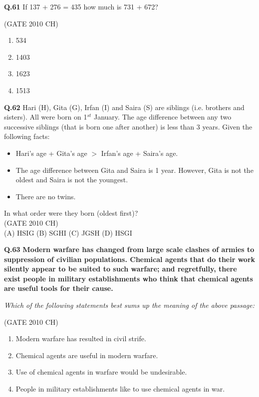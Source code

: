 \documentclass[journal,12pt,onecolumn]{exam}
\theoremstyle{remark}
\begin{document}
\noindent
\textbf{Q.61}
 If 137 + 276 = 435 how much is 731 + 672?

\hfill{(GATE 2010 CH)}\\

 \begin{enumerate}
     \item 534
     \item 1403
     \item 1623
     \item 1513
 \end{enumerate}

\noindent
\textbf{Q.62}
 Hari (H), Gita (G), Irfan (I) and Saira (S) are siblings (i.e. brothers and sisters). All were born on 1$^{st}$ January. The age difference between any two successive siblings (that is born one after another) is less than 3 years. Given the following facts:\\
\begin{itemize}
    \item[i.] Hari's age + Gita's age $>$ Irfan's age + Saira's age.
    \item[ii.] The age difference between Gita and Saira is 1 year. However, Gita is not the oldest and Saira is not the youngest.
    \item[iii.] There are no twins.
\end{itemize}
In what order were they born (oldest first)?\\

\hfill{(GATE 2010 CH)}\\

\noindent(A) HSIG \hspace{1cm} (B) SGHI \hspace{1cm} (C) JGSH \hspace{1cm} (D) HSGI
\vspace{0.5cm}

\noindent\textbf{Q.63} \textbf{Modern warfare has changed from large scale clashes of armies to suppression of civilian populations. Chemical agents that do their work silently appear to be suited to such warfare; and regretfully, there exist people in military establishments who think that chemical agents are useful tools for their cause.}

\noindent\textit{Which of the following statements best sums up the meaning of the above passage:}

\hfill{(GATE 2010 CH)}\\

\begin{enumerate}
    \item[(A)] Modern warfare has resulted in civil strife.
    \item[(B)] Chemical agents are useful in modern warfare.
    \item[(C)] Use of chemical agents in warfare would be undesirable.
    \item[(D)] People in military establishments like to use chemical agents in war.
\end{enumerate}
\end{document}
